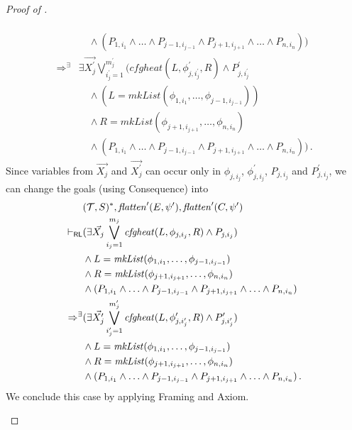 \begin{proof}[Proof of ]
\begin{enumerate}
\begin{align*}
        \\&\quad \land (P_{1, i_1} \land \ldots \land P_{j-1, i_{j-1}} \land P_{j+1, i_{j+1}} \land \ldots \land P_{n, i_n}))
        \\ \Rightarrow^\exists &
        \exists \vec{X^\prime_j} \bigvee_{i^\prime_j=1}^{m^\prime_j} (\mathit{cfgheat}(L, \phi^\prime_{j, i^\prime_j}, R) \land P^\prime_{j, i^\prime_j}
        \\&\quad \land (L = \mathit{mkList}(\phi_{1, i_1}, \ldots, \phi_{j-1, i_{j-1}}))
        \\&\quad \land R = \mathit{mkList}(\phi_{j+1, i_{j+1}}, \ldots, \phi_{n, i_{n}})
        \\&\quad \land (P_{1, i_1} \land \ldots \land P_{j-1, i_{j-1}} \land P_{j+1, i_{j+1}} \land \ldots \land P_{n, i_n})) \, .
    \end{align*}
    Since variables from $\vec{X_j}$ and $\vec{X_j^\prime}$ can occur only in $\phi_{j, i_j}$,
    $\phi^\prime_{j, i_j}$, $P_{j, i_j}$ and $P^\prime_{j, i_j}$, we can change the goals
    (using Consequence) into
    \begin{align*}
        & (\mathcal{T}, S)^*, \mathit{flatten}^\prime(E, \psi^\prime), \mathit{flatten}^\prime(C, \psi^\prime)
        \\ \vdash_{\mathsf{RL}} &
        (\exists \vec{X_j} \bigvee_{i_j=1}^{m_j} \mathit{cfgheat}(L, \phi_{j, i_j}, R) \land P_{j, i_j})
        \\&\land L = \mathit{mkList}(\phi_{1, i_1}, \ldots, \phi_{j-1, i_{j-1}})
        \\&\land R = \mathit{mkList}(\phi_{j+1, i_{j+1}}, \ldots, \phi_{n, i_{n}})
        \\&\land (P_{1, i_1} \land \ldots \land P_{j-1, i_{j-1}} \land P_{j+1, i_{j+1}} \land \ldots \land P_{n, i_n})
        \\ \Rightarrow^\exists &
        (\exists \vec{X^\prime_j} \bigvee_{i^\prime_j=1}^{m^\prime_j} \mathit{cfgheat}(L, \phi^\prime_{j, i^\prime_j}, R) \land P^\prime_{j, i^\prime_j})
        \\&\land L = \mathit{mkList}(\phi_{1, i_1}, \ldots, \phi_{j-1, i_{j-1}})
        \\&\land R = \mathit{mkList}(\phi_{j+1, i_{j+1}}, \ldots, \phi_{n, i_{n}})
        \\&\land (P_{1, i_1} \land \ldots \land P_{j-1, i_{j-1}} \land P_{j+1, i_{j+1}} \land \ldots \land P_{n, i_n}) \, .
    \end{align*}
    We conclude this case by applying Framing and Axiom.
    

\end{enumerate}
\end{proof}

